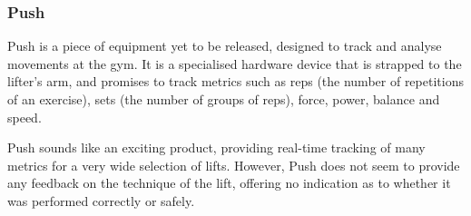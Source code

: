 \subsubsection{Push}

Push\cite{push} is a piece of equipment yet to be released, designed to track and analyse movements at the gym. It is a specialised hardware device that is strapped to the lifter's arm, and promises to track metrics such as reps (the number of repetitions of an exercise), sets (the number of groups of reps), force, power, balance and speed.

Push sounds like an exciting product, providing real-time tracking of many metrics for a very wide selection of lifts. However, Push does not seem to provide any feedback on the technique of the lift, offering no indication as to whether it was performed correctly or safely.
